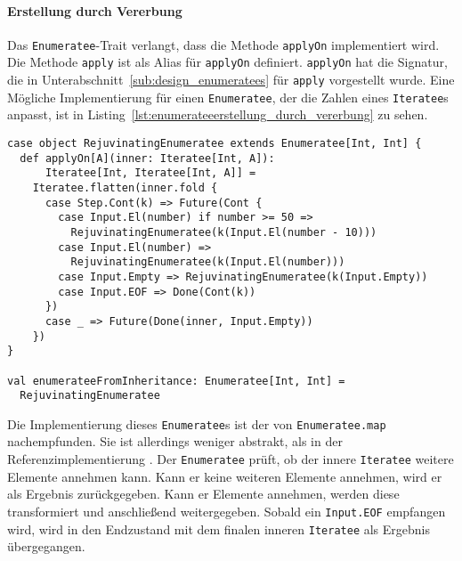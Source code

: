 \paragraph{Erstellung durch Vererbung} %
\label{par:enumerateeerstellung_durch_vererbung}\mbox{} %

Das \lstinline|Enumeratee|-Trait verlangt, dass die Methode \lstinline|applyOn| implementiert wird.
Die Methode \lstinline|apply| ist als Alias für \lstinline|applyOn| definiert.
\lstinline|applyOn| hat die Signatur, die in Unterabschnitt~\ref{sub:design_enumeratees} für \lstinline|apply| vorgestellt wurde.
Eine Mögliche Implementierung für einen \lstinline|Enumeratee|, der die Zahlen eines \lstinline|Iteratee|s anpasst, ist in Listing~\ref{lst:enumerateeerstellung_durch_vererbung} zu sehen.

\begin{lstlisting}[caption=Erstellung eines Enumeratees durch Vererbung, label=lst:enumerateeerstellung_durch_vererbung]
case object RejuvinatingEnumeratee extends Enumeratee[Int, Int] {
  def applyOn[A](inner: Iteratee[Int, A]):
      Iteratee[Int, Iteratee[Int, A]] =
    Iteratee.flatten(inner.fold {
      case Step.Cont(k) => Future(Cont {
        case Input.El(number) if number >= 50 =>
          RejuvinatingEnumeratee(k(Input.El(number - 10)))
        case Input.El(number) =>
          RejuvinatingEnumeratee(k(Input.El(number)))
        case Input.Empty => RejuvinatingEnumeratee(k(Input.Empty))
        case Input.EOF => Done(Cont(k))
      })
      case _ => Future(Done(inner, Input.Empty))
    })
}

val enumerateeFromInheritance: Enumeratee[Int, Int] =
  RejuvinatingEnumeratee
\end{lstlisting}

Die Implementierung dieses \lstinline|Enumeratee|s ist der von \lstinline|Enumeratee.map| nachempfunden.
Sie ist allerdings weniger abstrakt, als in der Referenzimplementierung \cite[vgl.][Z.~372, Z.~196 und Z.~85]{play_enumeratee_source_code}.
Der \lstinline|Enumeratee| prüft, ob der innere \lstinline|Iteratee| weitere Elemente annehmen kann.
Kann er keine weiteren Elemente annehmen, wird er als Ergebnis zurückgegeben.
Kann er Elemente annehmen, werden diese transformiert und anschließend weitergegeben.
Sobald ein \lstinline|Input.EOF| empfangen wird, wird in den Endzustand mit dem finalen inneren \lstinline|Iteratee| als Ergebnis übergegangen.


